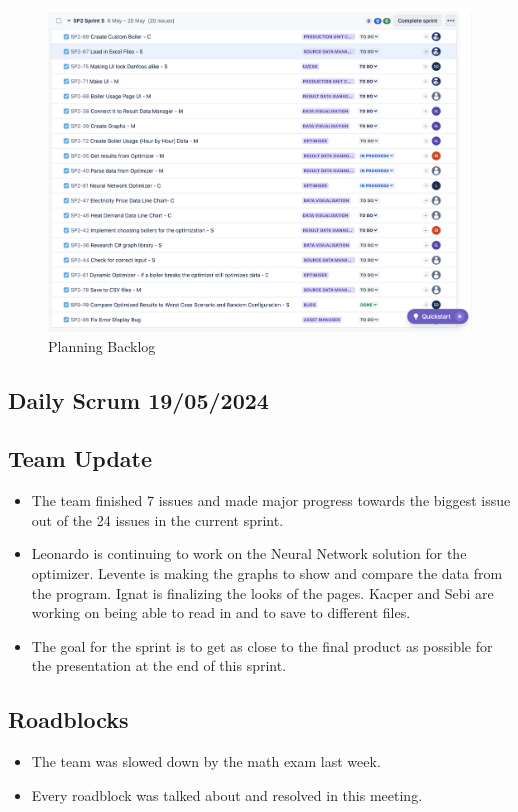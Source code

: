 \documentclass[12pt]{report}
\begin{document}
\begin{figure}[H]
  \centering
  \includegraphics[width=1\textwidth]{Resources/5-Sprint/Planning/Jira.png}
  \caption{Planning Backlog}
  \label{fig:S5Planning-image}
\end{figure}
\clearpage

\subsection*{Daily Scrum 19/05/2024}
\subsection*{Team Update}
\begin{itemize}
    \item The team finished 7 issues and made major progress towards the biggest issue out of the 24 issues in the current sprint.
    \item Leonardo is continuing to work on the Neural Network solution for the optimizer. Levente is making the graphs to show and compare the data from the program. Ignat is finalizing the looks of the pages. Kacper and Sebi are working on being able to read in and to save to different files.
    \item The goal for the sprint is to get as close to the final product as possible for the presentation at the end of this sprint.
\end{itemize}

\subsection*{Roadblocks}
\begin{itemize}
    \item The team was slowed down by the math exam last week.
    \item Every roadblock was talked about and resolved in this meeting.
\end{itemize}
\end{document}
